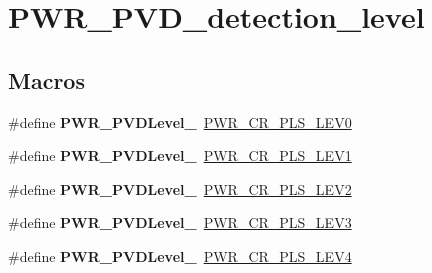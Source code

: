 \hypertarget{group___p_w_r___p_v_d__detection__level}{}\section{P\+W\+R\+\_\+\+P\+V\+D\+\_\+detection\+\_\+level}
\label{group___p_w_r___p_v_d__detection__level}
\subsection*{Macros}
\begin{DoxyCompactItemize}
\item 
\hypertarget{group___p_w_r___p_v_d__detection__level_gac8ec8a52046b242f03dcf8a4f32fb04b}{}\#define {\bfseries P\+W\+R\+\_\+\+P\+V\+D\+Level\+\_}~\hyperlink{group___peripheral___registers___bits___definition_gacb6b904b20d7e4fff958c75748861216}{P\+W\+R\+\_\+\+C\+R\+\_\+\+P\+L\+S\+\_\+\+L\+E\+V0}\label{group___p_w_r___p_v_d__detection__level_gac8ec8a52046b242f03dcf8a4f32fb04b}

\item 
\hypertarget{group___p_w_r___p_v_d__detection__level_ga0d090f9683877c0e8a5546a56d5ad888}{}\#define {\bfseries P\+W\+R\+\_\+\+P\+V\+D\+Level\+\_}~\hyperlink{group___peripheral___registers___bits___definition_ga15b71263f73f0c4e53ca91fc8d096818}{P\+W\+R\+\_\+\+C\+R\+\_\+\+P\+L\+S\+\_\+\+L\+E\+V1}\label{group___p_w_r___p_v_d__detection__level_ga0d090f9683877c0e8a5546a56d5ad888}

\item 
\hypertarget{group___p_w_r___p_v_d__detection__level_gabaccdd03ff6fbfa16e6a1283a2e6b989}{}\#define {\bfseries P\+W\+R\+\_\+\+P\+V\+D\+Level\+\_}~\hyperlink{group___peripheral___registers___bits___definition_ga2ea128abc2fc4252b53d09ca2850e69e}{P\+W\+R\+\_\+\+C\+R\+\_\+\+P\+L\+S\+\_\+\+L\+E\+V2}\label{group___p_w_r___p_v_d__detection__level_gabaccdd03ff6fbfa16e6a1283a2e6b989}

\item 
\hypertarget{group___p_w_r___p_v_d__detection__level_gabbd91e2587a81908837b0a759694fba9}{}\#define {\bfseries P\+W\+R\+\_\+\+P\+V\+D\+Level\+\_}~\hyperlink{group___peripheral___registers___bits___definition_ga9c1782980a2fb12de80058729a74f174}{P\+W\+R\+\_\+\+C\+R\+\_\+\+P\+L\+S\+\_\+\+L\+E\+V3}\label{group___p_w_r___p_v_d__detection__level_gabbd91e2587a81908837b0a759694fba9}

\item 
\hypertarget{group___p_w_r___p_v_d__detection__level_ga81f75ef83b2aa4b0f23f75b01ae6afcf}{}\#define {\bfseries P\+W\+R\+\_\+\+P\+V\+D\+Level\+\_}~\hyperlink{group___peripheral___registers___bits___definition_ga0fe79f097ea6c30a4ccf69ed3e177f85}{P\+W\+R\+\_\+\+C\+R\+\_\+\+P\+L\+S\+\_\+\+L\+E\+V4}\label{group___p_w_r___p_v_d__detection__level_ga81f75ef83b2aa4b0f23f75b01ae6afcf}


\end{DoxyCompactItemize}
